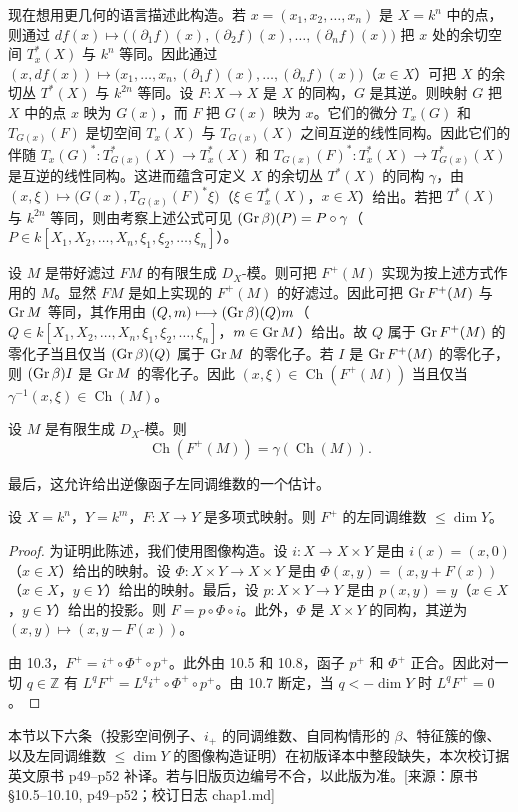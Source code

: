现在想用更几何的语言描述此构造。若 $x=(x_1,x_2,\dots,x_n)$ 是 $X=k^n$ 中的点，则通过 $df(x)\longmapsto\bigl((\partial_1f)(x),(\partial_2f)(x),\dots,(\partial_nf)(x)\bigr)$ 把 $x$ 处的余切空间 $T_x^*(X)$ 与 $k^n$ 等同。因此通过 $(x,df(x))\longmapsto\bigl(x_1,\dots,x_n,(\partial_1f)(x),\dots,(\partial_nf)(x)\bigr)$（$x\in X$）可把 $X$ 的余切丛 $T^*(X)$ 与 $k^{2n}$ 等同。设 $F:X\longrightarrow X$ 是 $X$ 的同构，$G$ 是其逆。则映射 $G$ 把 $X$ 中的点 $x$ 映为 $G(x)$，而 $F$ 把 $G(x)$ 映为 $x$。它们的微分 $T_x(G)$ 和 $T_{G(x)}(F)$ 是切空间 $T_x(X)$ 与 $T_{G(x)}(X)$ 之间互逆的线性同构。因此它们的伴随 $T_x(G)^*:T_{G(x)}^*(X)\to T_x^*(X)$ 和 $T_{G(x)}(F)^*:T_x^*(X)\to T_{G(x)}^*(X)$ 是互逆的线性同构。这进而蕴含可定义 $X$ 的余切丛 $T^*(X)$ 的同构 $\gamma$，由 $(x,\xi)\longmapsto\bigl(G(x),T_{G(x)}(F)^*\xi\bigr)$（$\xi\in T_x^*(X)$，$x\in X$）给出。若把 $T^*(X)$ 与 $k^{2n}$ 等同，则由考察上述公式可见 $(\operatorname{Gr}\beta)(P)=P\circ\gamma$（$P\in k[X_1,X_2,\dots,X_n,\xi_1,\xi_2,\dots,\xi_n]$）。

设 $M$ 是带好滤过 $F M$ 的有限生成 $D_X$-模。则可把 $F^+(M)$ 实现为按上述方式作用的 $M$。显然 $F M$ 是如上实现的 $F^+(M)$ 的好滤过。因此可把 $\operatorname{Gr} F^+(M)$ 与 $\operatorname{Gr} M$ 等同，其作用由 $(Q,m)\longmapsto(\operatorname{Gr}\beta)(Q)m$（$Q\in k[X_1,X_2,\dots,X_n,\xi_1,\xi_2,\dots,\xi_n]$，$m\in\operatorname{Gr} M$）给出。故 $Q$ 属于 $\operatorname{Gr} F^+(M)$ 的零化子当且仅当 $(\operatorname{Gr}\beta)(Q)$ 属于 $\operatorname{Gr} M$ 的零化子。若 $I$ 是 $\operatorname{Gr} F^+(M)$ 的零化子，则 $(\operatorname{Gr}\beta)I$ 是 $\operatorname{Gr} M$ 的零化子。因此 $(x,\xi)\in\operatorname{Ch}(F^+(M))$ 当且仅当 $\gamma^{-1}(x,\xi)\in\operatorname{Ch}(M)$。

\begin{lemma}
设 $M$ 是有限生成 $D_X$-模。则
$$\operatorname{Ch}(F^+(M))=\gamma(\operatorname{Ch}(M)).$$
\end{lemma}

最后，这允许给出逆像函子左同调维数的一个估计。

\begin{theorem}
设 $X=k^n$，$Y=k^m$，$F:X\longrightarrow Y$ 是多项式映射。则 $F^+$ 的左同调维数 $\le\dim Y$。
\end{theorem}

\begin{proof}
为证明此陈述，我们使用图像构造。设 $i:X\to X\times Y$ 是由 $i(x)=(x,0)$（$x\in X$）给出的映射。设 $\Phi:X\times Y\to X\times Y$ 是由 $\Phi(x,y)=(x,y+F(x))$（$x\in X$，$y\in Y$）给出的映射。最后，设 $p:X\times Y\to Y$ 是由 $p(x,y)=y$（$x\in X$，$y\in Y$）给出的投影。则 $F=p\circ\Phi\circ i$。此外，$\Phi$ 是 $X\times Y$ 的同构，其逆为 $(x,y)\longmapsto(x,y-F(x))$。

由 10.3，$F^+=i^+\circ\Phi^+\circ p^+$。此外由 10.5 和 10.8，函子 $p^+$ 和 $\Phi^+$ 正合。因此对一切 $q\in\mathbb{Z}$ 有 $L^qF^+=L^qi^+\circ\Phi^+\circ p^+$。由 10.7 断定，当 $q<-\dim Y$ 时 $L^qF^+=0$。
\end{proof}
\begin{annote}
本节以下六条（投影空间例子、$i_+$ 的同调维数、自同构情形的 $\beta$、特征簇的像、以及左同调维数 $\le\dim Y$ 的图像构造证明）在初版译本中整段缺失，本次校订据英文原书 p49–p52 补译。若与旧版页边编号不合，以此版为准。[来源：原书 §10.5–10.10, p49–p52；校订日志 chap1.md]
\end{annote}



